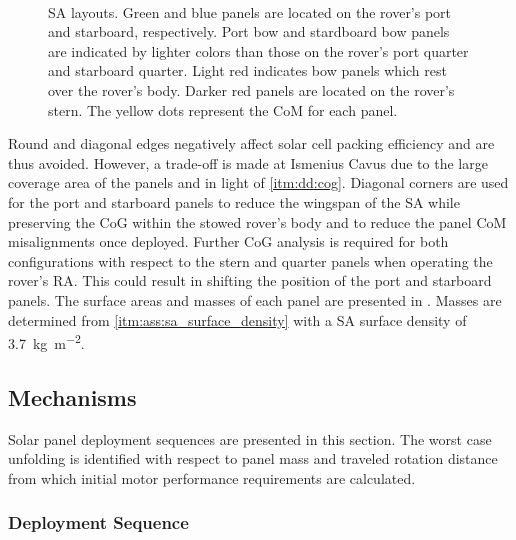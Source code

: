 \begin{figure}[h]
\begin{subfigure}[t]{\subfigureWidth}
		\label{fig:sub:solar-array-layouts-for-ismenius-cavus}
	\end{subfigure}\\[0.8ex]
    \caption[Solar array layouts]
            {\ac{SA} layouts. Green and blue panels are located on the rover's port and starboard, respectively. Port bow and stardboard bow panels are indicated by lighter colors than those on the rover's port quarter and starboard quarter. Light red indicates bow panels which rest over the rover's body. Darker red panels are located on the rover's stern. The yellow dots represent the \ac{CoM} for each panel.}
    \label{fig:solar-array-layouts-for-missions-sites}
\vspace{-2ex}
\end{figure}

\vspace{0.5cm}

Round and diagonal edges negatively affect solar cell packing efficiency and are thus avoided. However, a trade-off is made at Ismenius Cavus due to the large coverage area of the panels and in light of \ref{itm:dd:cog}. Diagonal corners are used for the port and starboard panels to reduce the wingspan of the \ac{SA} while preserving the \ac{CoG} within the stowed rover's body and to reduce the panel \ac{CoM} misalignments once deployed. Further \ac{CoG} analysis is required for both configurations with respect to the stern and quarter panels when operating the rover's \ac{RA}. This could result in shifting the position of the port and starboard panels. The surface areas and masses of each panel are presented in . Masses are determined from \ref{itm:ass:sa_surface_density} with a \ac{SA} surface density of \SI{3.7}{kg.m^{-2}}.

\vspace{0.4cm}



\clearpage
\subsection{Mechanisms}
Solar panel deployment sequences are presented in this section. The worst case unfolding is identified with respect to panel mass and traveled rotation distance from which initial motor performance requirements are calculated.

\subsubsection{Deployment Sequence}

